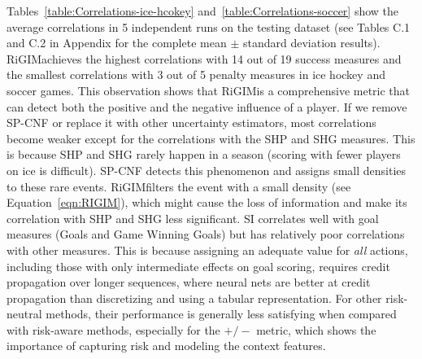 \documentclass{article}
\newcommand{\sys}{RiGIM}
\newcommand{\system}{\sys\;}
\begin{document}
Tables~\ref{table:Correlations-ice-hcokey} and~\ref{table:Correlations-soccer} show the average correlations in 5 independent runs on the testing dataset (see Tables C.1 and C.2 in Appendix for the complete mean $\pm$ standard deviation results). \system achieves the highest correlations with 14 out of 19 success measures and the smallest correlations with 3 out of 5 penalty measures in ice hockey and soccer games. This observation shows that \system is a comprehensive metric that can detect both the positive and the negative influence of a player. If we remove SP-CNF or replace it with other uncertainty estimators, most correlations become weaker except for the correlations with the SHP and SHG measures. This is because SHP and SHG rarely happen in a season (scoring with fewer players on ice is difficult). SP-CNF detects this phenomenon and assigns small densities to these rare events. \system filters the event with a small density (see Equation~\ref{eqn:RIGIM}), which might cause the loss of information and make its correlation with SHP and SHG less significant.
SI correlates well with goal measures (Goals and Game Winning Goals) but has relatively poor correlations with other measures. This is because assigning an adequate value for {\em all} actions, including those with only intermediate effects on goal scoring, requires credit propagation over longer sequences, where neural nets are better at credit propagation than discretizing and using a tabular representation.
For other risk-neutral methods, their performance is generally less satisfying when compared with risk-aware methods, especially for the $+/-$ metric, which shows the importance of capturing risk and modeling the context features.
\end{document}
